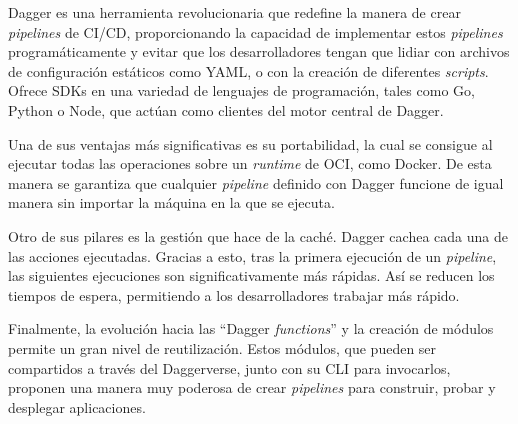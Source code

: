 Dagger es una herramienta revolucionaria que redefine la manera de crear \textit{pipelines} de CI/CD, proporcionando la capacidad de implementar estos \textit{pipelines} programáticamente y evitar que los desarrolladores tengan que lidiar con archivos de configuración estáticos como YAML, o con la creación de diferentes \textit{scripts}. Ofrece SDKs en una variedad de lenguajes de programación, tales como Go, Python o Node, que actúan como clientes del motor central de Dagger.

Una de sus ventajas más significativas es su portabilidad, la cual se consigue al ejecutar todas las operaciones sobre un \textit{runtime} de OCI, como Docker. De esta manera se garantiza que cualquier \textit{pipeline} definido con Dagger funcione de igual manera sin importar la máquina en la que se ejecuta.

Otro de sus pilares es la gestión que hace de la caché. Dagger cachea cada una de las acciones ejecutadas. Gracias a esto, tras la primera ejecución de un \textit{pipeline}, las siguientes ejecuciones son significativamente más rápidas. Así se reducen los tiempos de espera, permitiendo a los desarrolladores trabajar más rápido.

Finalmente, la evolución hacia las ``Dagger \textit{functions}'' y la creación de módulos permite un gran nivel de reutilización. Estos módulos, que pueden ser compartidos a través del Daggerverse, junto con su CLI para invocarlos, proponen una manera muy poderosa de crear \textit{pipelines} para construir, probar y desplegar aplicaciones.
